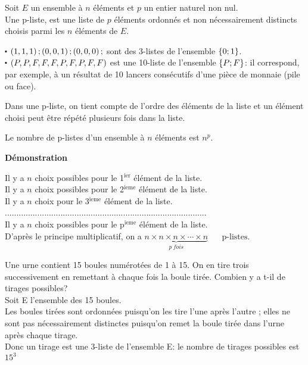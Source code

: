 \begin{definition}

Soit $ E $ un ensemble à $ n $ éléments et $ p $ un entier naturel non nul.\\
Une p-liste, est une liste  de $ p $ éléments ordonnés et non nécessairement distincts choisis parmi les $ n $ éléments de $ E $.
\end{definition}


\begin{example}

$ \centerdot $ $ \left(1,1,1\right); \left(0,0,1\right);\left(0,0,0\right); $ sont des 3-listes de l'ensemble $ \left\{0;1\right\} $.\\
$ \centerdot $  $ \left(P,P,F,F,F,P,F,P,F,F\right) $ est une 10-liste de l'ensemble $ \left\{P;F\right\} $: il correspond, par exemple, à un résultat de 10 lancers consécutifs d'une pièce de monnaie (pile ou face).
\end{example}

\begin{remark}

Dans une  p-liste, on tient compte de l'ordre des éléments de la liste et un élément choisi peut être répété plusieurs fois dans la liste.
\end{remark}
\begin{theorem}

Le nombre de p-listes  d'un ensemble à $ n $ éléments est $ n^{p}. $
\end{theorem}

\textbf{Démonstration}

Il y a $ n $ choix possibles pour  le 1$^{\text{ier}} $ élément de la liste.\\
Il y a $ n $ choix possibles pour  le 2$^{\text{ieme}} $ élément de la liste.\\
Il y a $ n $ choix pour  le 3$^{\text{ieme}}$ élément de la liste.\\
.......................................................................................\\
Il y a $ n $ choix possibles pour le p$^{\text{ieme}} $ élément de la liste.\\
D'après le principe multiplicatif, on a $\underbrace{ n \times n \times n \times \cdots \times n }_{p\  fois}$  $\quad\textrm{ p-listes} $.

 \begin{example}

Une urne contient 15 boules numérotées de 1 à 15. On en tire trois successivement en remettant à chaque fois la boule tirée.  Combien y a t-il de tirages  possibles? \\

Soit E l'ensemble des 15 boules.\\
Les boules tirées sont ordonnées puisqu'on les tire l'une après l'autre ; elles ne sont pas nécessairement distinctes puisqu'on remet la boule tirée dans l'urne  après chaque tirage.\\
Donc un tirage est une  3-liste  de l'ensemble E: le nombre de tirages possibles est $ 15^{3} $
 \end{example}

